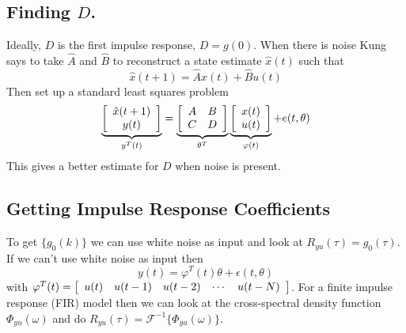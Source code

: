 \documentclass[lecture,12pt,]{pcms-l}
\theoremstyle{example}
\newcommand{\w}{\omega}
\newcommand{\vp}{\varphi}
\begin{document}
\subsection{Finding $D$.}
Ideally, $D$ is the first impulse response, $D=g(0)$. When there is noise Kung says to take $\hat{A}$ and $\hat{B}$ to reconstruct a state estimate $\hat{x}(t)$ such that
$$\hat{x}(t+1) = \hat{A}x(t)+\hat{B}u(t)$$
Then set up a standard least squares problem
\begin{align*}
\underbrace{\left[\begin{array}{c} \hat{x}(t+1) \\ y(t) \end{array}\right]}_{y^T(t)}
= \underbrace{\left[\begin{array}{c c} A & B \\ C & D \end{array}\right]}_{\theta^T}
\underbrace{\left[\begin{array}{c} x(t) \\ u(t) \end{array}\right]}_{\vp(t)} + e(t,\theta)
\end{align*}
This gives a better estimate for $D$ when noise is present.

\subsection{Getting Impulse Response Coefficients}
To get $\{g_0(k)\}$ we can use white noise as input and look at $R_{yu}(\tau)=g_0(\tau)$. If we can't use white noise as input then
$$y(t) = \vp^T(t)\theta+\epsilon(t,\theta)$$
with $\vp^T(t) = \left[\begin{array}{c c c c c} u(t) & u(t-1) & u(t-2) & \cdots & u(t-N) \end{array}\right]$. For a finite impulse response (FIR) model then we can look at the cross-spectral density function $\Phi_{yu}(\w)$ and do $R_{yu}(\tau) = \mathcal{F}^{-1}\{\Phi_{yu}(\w)\}$.
\end{document}
